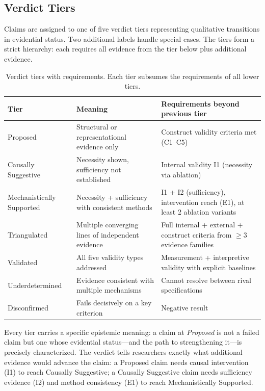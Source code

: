\documentclass[10pt]{article}
\newcommand{\tighttable}{\setlength{\tabcolsep}{4pt}\renewcommand{\arraystretch}{1.05}}
\begin{document}
\subsection{Verdict Tiers}
\label{sec:verdict-tiers}

Claims are assigned to one of five verdict tiers representing qualitative transitions in evidential status. Two additional labels handle special cases. The tiers form a strict hierarchy: each requires all evidence from the tier below plus additional evidence.

\begin{table}[t]
\centering
\tighttable
\caption{Verdict tiers with requirements. Each tier subsumes the requirements of all lower tiers.}
\label{tab:verdicts}
\small
\begin{tabular}{@{}lp{4.5cm}p{5.5cm}@{}}
\toprule
\textbf{Tier} & \textbf{Meaning} & \textbf{Requirements beyond previous tier} \\
\midrule
Proposed & Structural or representational evidence only & Construct validity criteria met (C1--C5) \\
Causally Suggestive & Necessity shown, sufficiency not established & Internal validity I1 (necessity via ablation) \\
Mechanistically Supported & Necessity + sufficiency with consistent methods & I1 + I2 (sufficiency), intervention reach (E1), at least 2 ablation variants \\
Triangulated & Multiple converging lines of independent evidence & Full internal + external + construct criteria from $\geq 3$ evidence families \\
Validated & All five validity types addressed & Measurement + interpretive validity with explicit baselines \\
\midrule
Underdetermined & Evidence consistent with multiple mechanisms & Cannot resolve between rival specifications \\
Disconfirmed & Fails decisively on a key criterion & Negative result \\
\bottomrule
\end{tabular}
\end{table}

Every tier carries a specific epistemic meaning: a claim at \emph{Proposed} is not a failed claim but one whose evidential status---and the path to strengthening it---is precisely characterized. The verdict tells researchers exactly what additional evidence would advance the claim: a Proposed claim needs causal intervention (I1) to reach Causally Suggestive; a Causally Suggestive claim needs sufficiency evidence (I2) and method consistency (E1) to reach Mechanistically Supported.
\end{document}
